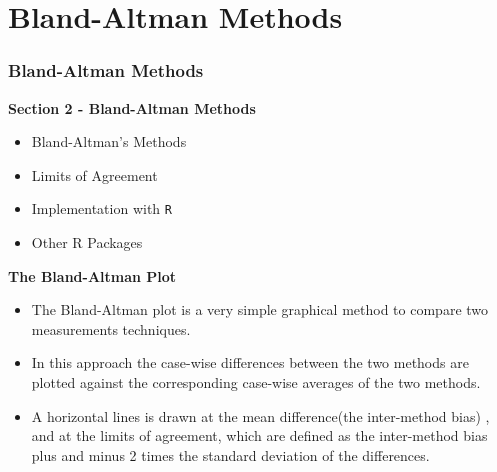 \documentclass[compress]{beamer}        %
\makeatletter
\newcommand{\tcb}{\textcolor{beamer@blendedblue}}
\makeatother
\begin{document}
\section{Bland-Altman Methods}

\begin{frame}
\frametitle{Bland-Altman Methods}
\large
\textbf{Section 2 - Bland-Altman Methods}
\begin{itemize}
\item Bland-Altman's Methods
\item Limits of Agreement
\item Implementation with \texttt{R}
\item Other R Packages
\end{itemize}
\end{frame}


\begin{frame}{\bf \tcb{The Bland-Altman Plot}}
\begin{itemize}\itemsep0.7cm

\item The Bland-Altman plot \cite{BA86,BA99} is a very simple graphical method to compare two measurements techniques. \item In this approach the case-wise differences between the two methods are plotted against the corresponding case-wise averages of the two methods.

\item A horizontal lines is drawn at the mean difference(the inter-method bias) , and at the limits of agreement, which are defined as the inter-method bias plus and minus 2 times the standard deviation of the differences.
\end{itemize}
\end{frame}












\end{document}
